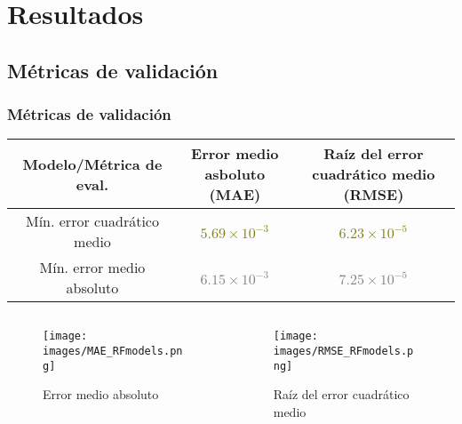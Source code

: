 \documentclass{beamer}
\begin{document}
  \section{Resultados}

  \subsection*{Métricas de validación}

  \begin{frame}
    \frametitle{Métricas de validación}

    \begin{center}
      \begin{tabular}{| c | c | c |}
        \hline
        Modelo/Métrica de eval. & \parbox{7em}{\centering Error medio \\asboluto (MAE)} & \parbox{7em}{\centering Raíz del error \\ cuadrático medio (RMSE)}\\ \hline
        Mín. error cuadrático medio &  \textcolor{olive}{$5.69\times 10^{-3}$} & \textcolor{olive}{$6.23 \times 10^{-5}$}\\
        Mín. error medio absoluto & \textcolor{gray}{$6.15\times 10^{-3}$} & \textcolor{gray}{$7.25 \times 10^{-5}$}\\
        \hline
      \end{tabular}
      
    \end{center}

    \begin{columns}

      \begin{column}{0.5\textwidth}
        \begin{figure}
          \centering
          \texttt{[image: images/MAE\_RFmodels.png]}
          \caption{Error medio absoluto}
        \end{figure}
      \end{column}

      \begin{column}{0.5\textwidth}
        \begin{figure}
          \centering
          \texttt{[image: images/RMSE\_RFmodels.png]}
          \caption{Raíz del error cuadrático medio}
        \end{figure}
      \end{column}
    \end{columns}
  \end{frame}
\end{document}
